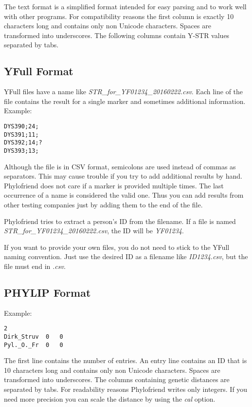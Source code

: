 The text format is a simplified format intended for easy
parsing and to work well with other programs. For compatibility
reasons the first column is exactly 10 characters long and
contains only non Unicode characters. Spaces are transformed into
underscores. The following columns contain Y-STR values
separated by tabs.


\subsection{YFull Format}

YFull files have a name like \emph{STR\_for\_YF01234\_20160222.csv}.
Each line of the file contains the result for a single marker and
sometimes additional information. Example:

\begin{verbatim}
DYS390;24;
DYS391;11;
DYS392;14;?
DYS393;13;
\end{verbatim}

Although the file is in CSV format, semicolons are used instead
of commas as separators. This may cause trouble if you try to
add additional results by hand. Phylofriend does not care if a
marker is provided multiple times. The last occurrence of a name
is considered the valid one. Thus you can add results from other
testing companies just by adding them to the end of the file.

Phylofriend tries to extract a person's ID from the filename. If
a file is named \emph{STR\_for\_YF01234\_20160222.csv}, the ID
will be \emph{YF01234}.

If you want to provide your own files, you do not need to stick
to the YFull naming convention. Just use the desired ID as a
filename like \emph{ID1234.csv}, but the file must end in 
\emph{.csv}.


\subsection{PHYLIP Format}

Example:

\begin{verbatim}
2
Dirk_Struv	0	0
Pyl._O._Fr	0	0
\end{verbatim}

The first line contains the number of entries. An entry
line contains an ID that is 10 characters long and contains
only non Unicode characters. Spaces are transformed into
underscores. The columns containing genetic distances
are separated by tabs. For readability reasons
Phylofriend writes only integers. If you need more precision
you can scale the distance by using the \emph{cal} option.







